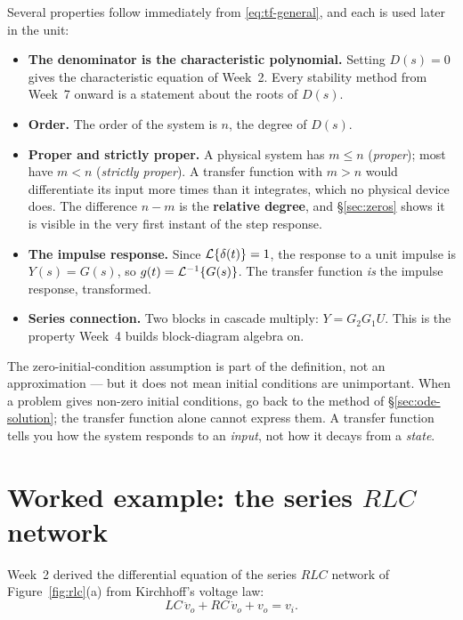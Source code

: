 \documentclass[11pt,a4paper]{article}
\begin{document}
Several properties follow immediately from \eqref{eq:tf-general}, and each is
used later in the unit:

\begin{itemize}[leftmargin=*]
\item \textbf{The denominator is the characteristic polynomial.} Setting
      $D(s)=0$ gives the characteristic equation of Week~2. Every stability
      method from Week~7 onward is a statement about the roots of $D(s)$.
\item \textbf{Order.} The order of the system is $n$, the degree of $D(s)$.
\item \textbf{Proper and strictly proper.} A physical system has $m\le n$
      (\emph{proper}); most have $m<n$ (\emph{strictly proper}). A transfer
      function with $m>n$ would differentiate its input more times than it
      integrates, which no physical device does. The difference $n-m$ is the
      \textbf{relative degree}, and \S\ref{sec:zeros} shows it is visible in
      the very first instant of the step response.
\item \textbf{The impulse response.} Since $\mathcal{L}\{\delta(t)\}=1$, the response
      to a unit impulse is $Y(s)=G(s)$, so $g(t)=\mathcal{L}^{-1}\{G(s)\}$. The
      transfer function \emph{is} the impulse response, transformed.
\item \textbf{Series connection.} Two blocks in cascade multiply:
      $Y=G_2G_1U$. This is the property Week~4 builds block-diagram algebra on.
\end{itemize}

\begin{pitfall}
The zero-initial-condition assumption is part of the definition, not an
approximation --- but it does not mean initial conditions are unimportant. When
a problem gives non-zero initial conditions, go back to the method of
\S\ref{sec:ode-solution}; the transfer function alone cannot express them. A
transfer function tells you how the system responds to an \emph{input}, not how
it decays from a \emph{state}.
\end{pitfall}

\section{Worked example: the series $RLC$ network}
\label{sec:rlc}

Week~2 derived the differential equation of the series $RLC$ network of
Figure~\ref{fig:rlc}(a) from Kirchhoff's voltage law:
\[
  LC\,\ddot v_o + RC\,\dot v_o + v_o = v_i .
\]
\end{document}
